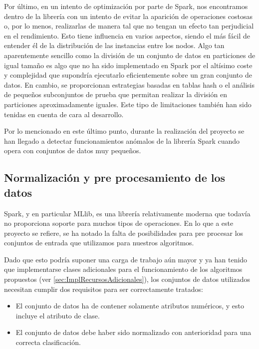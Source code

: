 Por último, en un intento de optimización por parte de Spark, nos encontramos dentro de la librería con un intento de evitar la aparición de operaciones costosas o, por lo menos, realizarlas de manera tal que no tengan un efecto tan perjudicial en el rendimiento. Esto tiene influencia en varios aspectos, siendo el más fácil de entender él de la distribución de las instancias entre los nodos. Algo tan aparentemente sencillo como la división de un conjunto de datos en particiones de igual tamaño es algo que no ha sido implementado en Spark por el altísimo coste y complejidad que supondría ejecutarlo eficientemente sobre un gran conjunto de datos. En cambio, se proporcionan estrategias basadas en tablas hash o el análisis de pequeños subconjuntos de prueba que permitan realizar la división en particiones aproximadamente iguales. Este tipo de limitaciones también han sido tenidas en cuenta de cara al desarrollo.

Por lo mencionado en este último punto, durante la realización del proyecto se han llegado a detectar funcionamientos anómalos de la librería Spark cuando opera con conjuntos de datos muy pequeños. 

\subsection{Normalización y pre procesamiento de los datos}

Spark, y en particular MLlib, es una librería relativamente moderna que todavía no proporciona soporte para muchos tipos de operaciones. En lo que a este proyecto se refiere, se ha notado la falta de posibilidades para pre procesar los conjuntos de entrada que utilizamos para nuestros algoritmos.

Dado que esto podría suponer una carga de trabajo aún mayor y ya han tenido que implementarse clases adicionales para el funcionamiento de los algoritmos propuestos (ver \ref{sec:ImplRecursosAdicionales}), los conjuntos de datos utilizados necesitan cumplir dos requisitos para ser correctamente tratados:

\begin{itemize}
\item El conjunto de datos ha de contener solamente atributos numéricos, y esto incluye el atributo de clase.
\item El conjunto de datos debe haber sido normalizado con anterioridad para una correcta clasificación.
\end{itemize}

